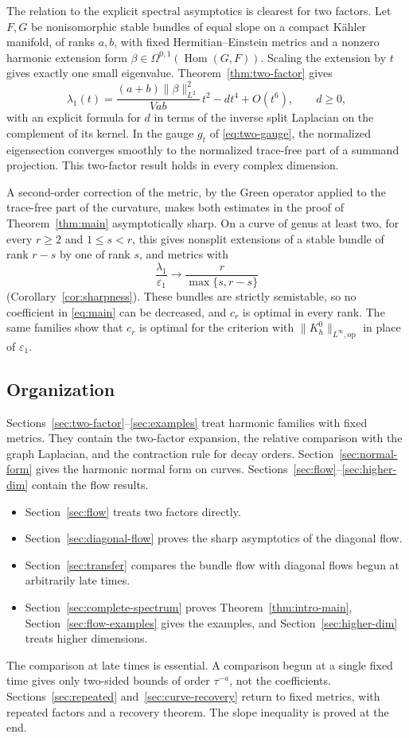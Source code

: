\documentclass[11pt]{amsart}
\theoremstyle{definition}
\theoremstyle{remark}
\newcommand{\op}{\mathrm{op}}
\newcommand{\Hom}{\operatorname{Hom}}
\begin{document}
The relation to the explicit spectral asymptotics is clearest for two
factors. Let $F,G$ be nonisomorphic stable bundles of equal slope on a
compact K\"ahler manifold, of ranks $a,b$, with fixed
Hermitian--Einstein metrics and a nonzero harmonic extension form
$\beta\in\Omega^{0,1}(\Hom(G,F))$. Scaling the extension by $t$ gives
exactly one small eigenvalue. Theorem~\ref{thm:two-factor} gives
\[
 \lambda_1(t)=\frac{(a+b)\lVert\beta\rVert_{L^2}^2}{Vab}\,t^2
 -dt^4+O(t^6),\qquad d\ge0,
\]
with an explicit formula for $d$ in terms of the inverse split
Laplacian on the complement of its kernel. In the gauge $g_t$ of
\eqref{eq:two-gauge}, the
normalized eigensection converges smoothly to the normalized trace-free
part of a summand projection. This two-factor result holds in every
complex dimension.

A second-order correction of the metric, by the Green operator applied to
the trace-free part of the curvature, makes both estimates in the proof of
Theorem~\ref{thm:main} asymptotically sharp. On a curve of genus at least
two, for every $r\ge2$ and $1\le s<r$, this gives nonsplit extensions of a
stable bundle of rank $r-s$ by one of rank $s$, and metrics with
\[
 \frac{\lambda_1}{\varepsilon_1}\longrightarrow\frac r{\max\{s,r-s\}}
\]
(Corollary~\ref{cor:sharpness}). These bundles are strictly semistable, so
no coefficient in \eqref{eq:main} can be decreased, and $c_r$ is optimal in
every rank. The same families show that $c_r$ is optimal for the criterion
with $\lVert K_h^0\rVert_{L^\infty,\op}$ in place of $\varepsilon_1$.

\subsection{Organization}

Sections~\ref{sec:two-factor}--\ref{sec:examples} treat harmonic families
with fixed metrics. They contain the two-factor expansion, the relative
comparison with the graph Laplacian, and the contraction rule for decay
orders. Section~\ref{sec:normal-form} gives the harmonic normal form on
curves. Sections~\ref{sec:flow}--\ref{sec:higher-dim} contain the flow
results.
\begin{itemize}
\item Section~\ref{sec:flow} treats two factors directly.
\item Section~\ref{sec:diagonal-flow} proves the sharp asymptotics of the
 diagonal flow.
\item Section~\ref{sec:transfer} compares the bundle flow with diagonal
 flows begun at arbitrarily late times.
\item Section~\ref{sec:complete-spectrum} proves
 Theorem~\ref{thm:intro-main}, Section~\ref{sec:flow-examples} gives the
 examples, and Section~\ref{sec:higher-dim} treats higher dimensions.
\end{itemize}
The comparison at late times is essential. A comparison begun at a single
fixed time gives only two-sided bounds of order $\tau^{-a}$, not the
coefficients. Sections~\ref{sec:repeated} and~\ref{sec:curve-recovery}
return to fixed metrics, with repeated factors and a recovery theorem. The
slope inequality is proved at the end.
\end{document}
